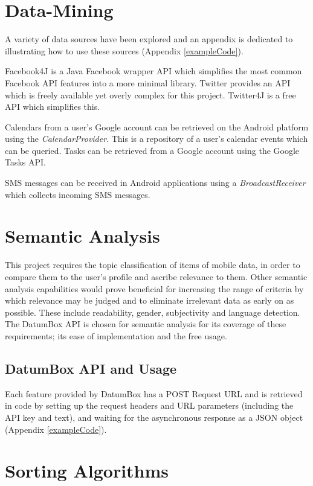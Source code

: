 \section{Data-Mining}

A variety of data sources have been explored and an appendix is dedicated to illustrating how to use these sources  (Appendix \ref{exampleCode}).

Facebook4J \cite{Facebook4JExample} is a Java Facebook wrapper API which simplifies the most common Facebook API features into a more minimal library. Twitter provides an API which is freely available yet overly complex for this project. Twitter4J \cite{Twitter4JExample} is a free API which simplifies this.

Calendars from a user's Google account can be retrieved on the Android platform using the \emph{CalendarProvider}. This is a repository of a user's calendar events which can be queried. Tasks can be retrieved from a Google account using the Google Tasks API.

SMS messages can be received in Android applications using a \emph{BroadcastReceiver} which collects incoming SMS messages.

\section{Semantic Analysis}

This project requires the topic classification of items of mobile data, in order to compare them to the user's profile and ascribe relevance to them. Other semantic analysis capabilities would prove beneficial for increasing the range of criteria by which relevance may be judged and to eliminate irrelevant data as early on as possible. These include readability, gender, subjectivity and language detection. The DatumBox API \cite{DatumBox} is chosen for semantic analysis for its coverage of these requirements; its ease of implementation and the free usage. 

\subsection{DatumBox API and Usage}

Each feature provided by DatumBox has a POST Request URL and is retrieved in code by setting up the request headers and URL parameters (including the API key and text), and waiting for the asynchronous response as a JSON object (Appendix \ref{exampleCode}).

\section{Sorting Algorithms}

